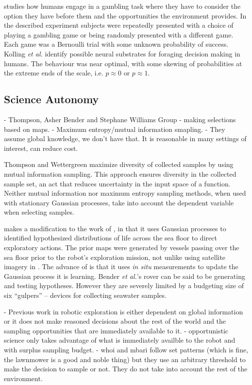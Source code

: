\cite{kolling2012neural} studies how humans engage in a gambling task where
they have to consider the option they have before them and the opportunities
the environment provides.  In the described experiment subjects were repeatedly
presented with a choice of playing a gambling game or being randomly presented
with a different game.  Each game was a Bernoulli trial with some unknown
probability of success.  Kolling \emph{et al.} identify possible neural
substrates for foraging decision making in humans.  The behaviour was near
optimal, with some skewing of probabilities at the extreme ends of the scale,
i.e. $p \approx 0$ or $p \approx 1$.


\subsection{Science Autonomy}

	- Thompson, Asher Bender and Stephane Williams Group
			- making selections based on maps.  
			- Maximum entropy/mutual information smapling.
			- They assume global knowledge, we don't have that.  It is reasonable
			in many settings of interest, can reduce cost.

Thompson and Wettergreen \cite{thompson2008intelligent} maximize diversity of
collected samples by using mutual information sampling.  This approach ensures
diversity in the collected sample set, an act that reduces uncertainty in the
input space of a function.  Neither mutual information nor maximum entropy
sampling methods, when used with stationary Gaussian processes, take into
account the dependent variable when selecting samples.  


\cite{bender2013autonomous} makes a modification to the work of
\cite{thompson2008intelligent}, in that it uses Gaussian processes to
identified hypothesized distributions of life across the sea floor to direct
exploratory actions.  The prior maps were generated by vessels passing over the
sea floor prior to the robot's exploration mission, not unlike using satellite
imagery in \cite{thompson2008intelligent}.  The advance of
\cite{bender2013autonomous} is that it uses \emph{in situ} measurements to
update the Gaussian process it is learning.  Bender \emph{et al.}'s rover can
be said to be generating and testing hypotheses.  However they are severely
limited by a budgeting size of six ``gulpers'' -- devices for collecting
seawater samples.


	- Previous work in robotic exploration is either dependent on global information or it does not make reasoned decisions about the rest of the world and the sampling opportunities that are immediately available to it.
			- opportunistic science only takes advantage of what is immediately availble to the robot and with surplus sampling budget.
			- whoi and mbari follow set patterns (which is fine, the lawnmower is a good and noble thing) but they use an arbitrary threshold to make the decision to sample or not.  They do not take into account the rest of the environment.


